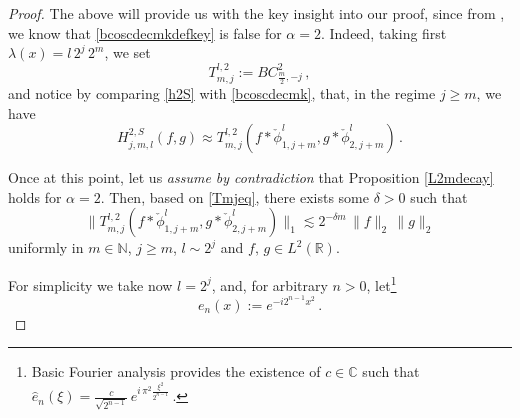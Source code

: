 \documentclass[a4paper,reqno]{amsart}
\numberwithin{equation}{section}
\theoremstyle{definition}
\newcommand{\R}{\mathbb{R}}
\newcommand{\C}{\mathbb{C}}
\newcommand{\N}{\mathbb{N}}
\def\a{\alpha}
\def\l{\lambda}
\def\d{\delta}
\begin{document}
\begin{proof}
The above will provide us with the key insight into our proof, since from \cite{BBLV21}, we know that \eqref{bcoscdecmkdefkey} is false for $\a=2$. Indeed, taking first $\l(x)=l\, 2^j\, 2^m$, we set
\begin{equation}\label{Tmj}
T_{m,j}^{l,2}:= BC^{2}_{\frac{m}{2},-j}\,,
\end{equation}	
and notice by comparing \eqref{h2S} with \eqref{bcoscdecmk}, that, in the regime $j\geq m$, we have 	
\begin{equation}\label{Tmjeq}
H^{2,S}_{j,m,l}(f,g)\approx T_{m,j}^{l,2}(f*\check{\phi}_{1,j+m}^l,g*\check{\phi}_{2,j+m}^l)\,.
\end{equation}
		
Once at this point, let us \emph{assume by contradiction} that Proposition \ref{L2mdecay} holds for $\a=2$. Then, based on \eqref{Tmjeq}, there exists some $\d>0$ such that
\begin{equation}\label{Tmjeq1}
\|T_{m,j}^{l,2}(f*\check{\phi}_{1,j+m}^l,g*\check{\phi}_{2,j+m}^l)\|_1\lesssim 2^{-\d m}\,\|f\|_2\,\|g\|_2
\end{equation}	
uniformly in $m\in\N$, $j\geq m$, $l\sim 2^j$ and $f,\,g\in L^2(\R)$.	
	
For simplicity we take now $l=2^{j}$, and, for arbitrary $n>0$, let\footnote{Basic Fourier analysis provides the existence of $c\in\C$ such that
$\hat{e}_n(\xi)=\frac{c}{\sqrt{2^{n-1}}}\, e^{i\,\pi^2\frac{\xi^2}{2^{n-1}}}\,.$}
\begin{equation}\label{ek}
e_n(x):=e^{-i 2^{n-1} x^2}\,.
\end{equation}	


\end{proof}
\end{document}
